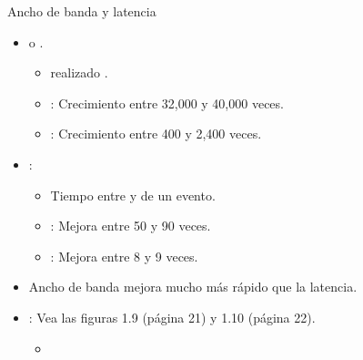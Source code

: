 \begin{frame}[t]{Ancho de banda y latencia}
  \begin{itemize}
    \item {} o .
      \begin{itemize}
        \item {} realizado .
        \item {}: Crecimiento entre 32,000 y 40,000 veces.
        \item {}: Crecimiento entre 400 y 2,400 veces.
      \end{itemize}

    \item {}:
      \begin{itemize}
        \item Tiempo entre  y  de un evento.
        \item {}: Mejora entre 50 y 90 veces.
        \item {}: Mejora entre 8 y 9 veces.
      \end{itemize}

    \item Ancho de banda mejora mucho más rápido que la latencia.

    \item {}: Vea las figuras 1.9 (página 21) y 1.10 (página 22).
      \begin{itemize}
        \item \bibhennessy
      \end{itemize}
  \end{itemize}
\end{frame}
